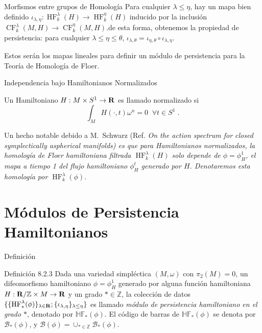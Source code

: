 \documentclass{beamer}
\def\CF{\operatorname{CF}}
\def\HF{\operatorname{HF}}
\def\Z{{\mathbb Z}}
\def\R\re
\def \R{{\bf R}}
\def \re{{\mathbb R}}
\begin{document}
\begin{frame}{Morfismos entre grupos de Homología}
    Para cualquier $\lambda \leq \eta$, hay un mapa bien definido $\iota_{\lambda, \eta}: \HF_k^{\lambda}(H) \to \HF_k^{\eta}(H)$ inducido por la inclusión $\CF_{k}^{\lambda}(M,H) \to \CF_{k}^{\eta}(M,H)$.\pause  de esta forma, obtenemos la propiedad de persistencia: \pause para cualquier $\lambda \leq \eta \leq \theta$, $\iota_{\lambda, \theta} = \iota_{\eta, \theta} \circ \iota_{\lambda, \eta}$. \pause

    Estos serán los mapas lineales para definir un módulo de persistencia para la Teoría de Homología de Floer. 


\end{frame}


\begin{frame}{Independencia bajo Hamiltonianos Normalizados}

Un Hamiltoniano $H: M \times S^1 \to \R$ es llamado normalizado si
$$\int_M H(\cdot,t)\omega^n = 0 \;\;\forall t \in S^1\;.$$\pause

Un hecho notable debido a M.~Schwarz (Ref. \it{On the action spectrum for closed symplectically aspherical manifolds}) es que para Hamiltonianos normalizados, la homología de Floer hamiltoniana filtrada $\HF_k^{\lambda}(H)$ solo depende de $\phi = \phi^1_H$, el mapa a tiempo 1 del flujo hamiltoniano $\phi^t_H$ generado por $H$. Denotaremos esta homología por $\HF_k^{\lambda}(\phi)$.
    
\end{frame}

\section{Módulos de Persistencia Hamiltonianos}
\begin{frame}{Definición}
\begin{block}{Definición 8.2.3}
Dada una variedad simpléctica $(M, \omega)$ con $\pi_2(M)=0$, un difeomorfismo hamiltoniano $\phi = \phi_H^1$ generado por alguna función hamiltoniana $H: \R/\Z \times M \to \R$ y un grado $\ast \in \Z$, \pause la colección de datos  $\{\{\HF_*^{\lambda}(\phi)\}_{\lambda \in \R}; \{\iota_{\lambda, \eta}\}_{\lambda \leq \eta} \}$ es llamado {\it módulo de persistencia hamiltoniano en el grado $\ast$}, denotado por $\mathbb {HF}_*(\phi)$. \pause El código de barras de $\mathbb{HF}_*(\phi)$ se denota por $\mathcal B_*(\phi)$, y $\mathcal B(\phi) = \cup_{\ast \in \Z} \mathcal B_*(\phi)$. 

 \end{block} 
    
\end{frame}
\end{document}
